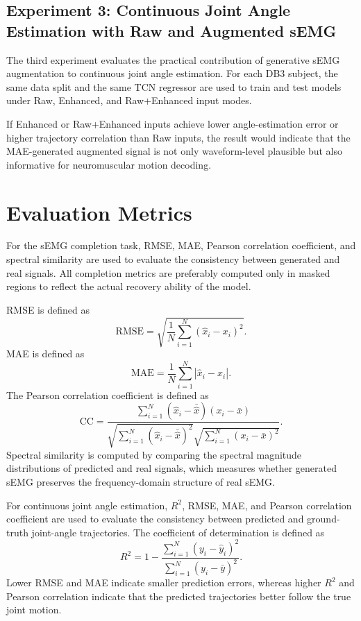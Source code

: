 \documentclass[journal]{IEEEtran}
\begin{document}
\subsection{Experiment 3: Continuous Joint Angle Estimation with Raw and Augmented sEMG}
The third experiment evaluates the practical contribution of generative sEMG augmentation to continuous joint angle estimation. For each DB3 subject, the same data split and the same TCN regressor are used to train and test models under Raw, Enhanced, and Raw+Enhanced input modes.

If Enhanced or Raw+Enhanced inputs achieve lower angle-estimation error or higher trajectory correlation than Raw inputs, the result would indicate that the MAE-generated augmented signal is not only waveform-level plausible but also informative for neuromuscular motion decoding.

\section{Evaluation Metrics}
For the sEMG completion task, RMSE, MAE, Pearson correlation coefficient, and spectral similarity are used to evaluate the consistency between generated and real signals. All completion metrics are preferably computed only in masked regions to reflect the actual recovery ability of the model.

RMSE is defined as
\begin{equation}
\mathrm{RMSE}=\sqrt{\frac{1}{N}\sum_{i=1}^{N}(\hat{x}_i-x_i)^2}.
\end{equation}
MAE is defined as
\begin{equation}
\mathrm{MAE}=\frac{1}{N}\sum_{i=1}^{N}|\hat{x}_i-x_i|.
\end{equation}
The Pearson correlation coefficient is defined as
\begin{equation}
\mathrm{CC}=\frac{\sum_{i=1}^{N}(\hat{x}_i-\bar{\hat{x}})(x_i-\bar{x})}{\sqrt{\sum_{i=1}^{N}(\hat{x}_i-\bar{\hat{x}})^2}\sqrt{\sum_{i=1}^{N}(x_i-\bar{x})^2}}.
\end{equation}
Spectral similarity is computed by comparing the spectral magnitude distributions of predicted and real signals, which measures whether generated sEMG preserves the frequency-domain structure of real sEMG.

For continuous joint angle estimation, $R^2$, RMSE, MAE, and Pearson correlation coefficient are used to evaluate the consistency between predicted and ground-truth joint-angle trajectories. The coefficient of determination is defined as
\begin{equation}
R^2=1-\frac{\sum_{i=1}^{N}(y_i-\hat{y}_i)^2}{\sum_{i=1}^{N}(y_i-\bar{y})^2}.
\end{equation}
Lower RMSE and MAE indicate smaller prediction errors, whereas higher $R^2$ and Pearson correlation indicate that the predicted trajectories better follow the true joint motion.
\end{document}
